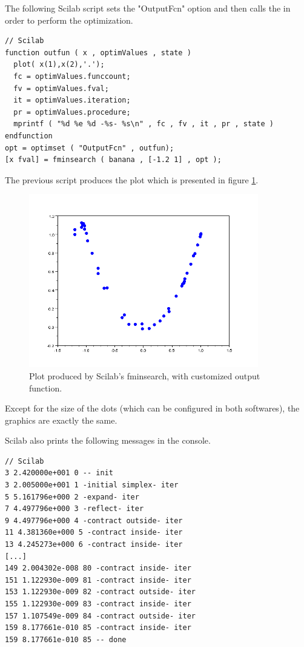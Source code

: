 The following Scilab script sets the "OutputFcn" option and then calls 
the  in order to perform the optimization.

\lstset{language=scilabscript}
\begin{lstlisting}
// Scilab
function outfun ( x , optimValues , state )
  plot( x(1),x(2),'.');
  fc = optimValues.funccount;
  fv = optimValues.fval;
  it = optimValues.iteration;
  pr = optimValues.procedure;
  mprintf ( "%d %e %d -%s- %s\n" , fc , fv , it , pr , state )
endfunction
opt = optimset ( "OutputFcn" , outfun);
[x fval] = fminsearch ( banana , [-1.2 1] , opt );
\end{lstlisting}

The previous script produces the plot which is presented 
in figure \ref{fig-fminsearch-scilab-outputfun}.

\begin{figure}
\begin{center}
\includegraphics[width=10cm]{fminsearch/testFminsearchPlotScilab.png}
\end{center}
\caption{Plot produced by Scilab's fminsearch, with customized output function.}
\label{fig-fminsearch-scilab-outputfun}
\end{figure}

Except for the size of the dots (which can be configured in 
both softwares), the graphics are exactly the same.

Scilab also prints the following messages in the console.

\lstset{language=scilabscript}
\begin{lstlisting}
// Scilab
3 2.420000e+001 0 -- init
3 2.005000e+001 1 -initial simplex- iter
5 5.161796e+000 2 -expand- iter
7 4.497796e+000 3 -reflect- iter
9 4.497796e+000 4 -contract outside- iter
11 4.381360e+000 5 -contract inside- iter
13 4.245273e+000 6 -contract inside- iter
[...]
149 2.004302e-008 80 -contract inside- iter
151 1.122930e-009 81 -contract inside- iter
153 1.122930e-009 82 -contract outside- iter
155 1.122930e-009 83 -contract inside- iter
157 1.107549e-009 84 -contract outside- iter
159 8.177661e-010 85 -contract inside- iter
159 8.177661e-010 85 -- done
\end{lstlisting}

